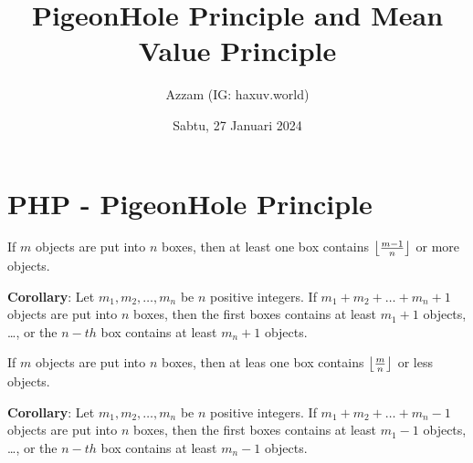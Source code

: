 \documentclass[11pt]{scrartcl}
\title{PigeonHole Principle and Mean Value Principle}
\author{Azzam (IG: haxuv.world)}
\date{Sabtu, 27 Januari 2024}
\begin{document}
\maketitle
\section{PHP - PigeonHole Principle}
\begin{definition}
     If $m$ objects are put into $n$ boxes, then at least one box contains $\left\lfloor \frac{m-1}{n} \right\rfloor$ or more objects.
\end{definition}

\textbf{Corollary}: Let $m_1, m_2, \dots, m_n$ be $n$ positive integers. If $m_1+m_2+\dots+m_n+1$ objects are put into $n$ boxes, then the first boxes contains at least $m_1+1$ objects, \dots, or the $n-th$ box contains at least $m_n+1$ objects.

\begin{definition}
    If $m$ objects are put into $n$ boxes, then at leas one box contains $\left\lfloor \frac{m}{n} \right\rfloor$ or less objects.
\end{definition}

\textbf{Corollary}: Let $m_1, m_2, \dots, m_n$ be $n$ positive integers. If $m_1+m_2+\dots+m_n-1$ objects are put into $n$ boxes, then the first boxes contains at least $m_1-1$ objects, \dots, or the $n-th$ box contains at least $m_n-1$ objects.
\end{document}

